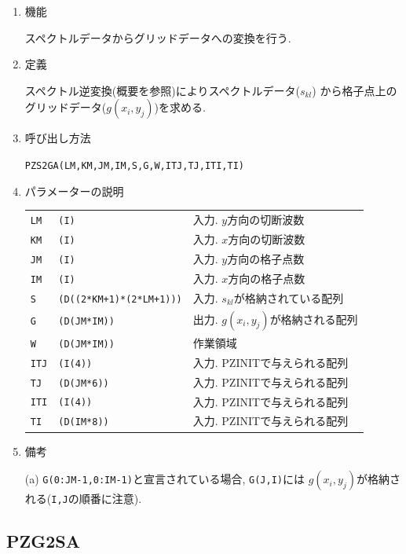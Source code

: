 \documentclass[a4j,fleqn]{jarticle}
\begin{document}
\begin{enumerate}

\item 機能 

スペクトルデータからグリッドデータへの変換を行う.

\item 定義

スペクトル逆変換(概要を参照)によりスペクトルデータ($s_{kl}$)
から格子点上のグリッドデータ($g(x_i,y_j)$)を求める.

\item 呼び出し方法 

{\tt PZS2GA(LM,KM,JM,IM,S,G,W,ITJ,TJ,ITI,TI)}
  
\item パラメーターの説明

\begin{tabular}{lll}
{\tt LM} & {\tt (I)} & 入力. $y$方向の切断波数\\
{\tt KM} & {\tt (I)} & 入力. $x$方向の切断波数\\
{\tt JM} & {\tt (I)} & 入力. $y$方向の格子点数\\
{\tt IM} & {\tt (I)} & 入力. $x$方向の格子点数\\
{\tt S} & {\tt (D((2*KM+1)*(2*LM+1)))} & 入力. $s_{kl}$が格納されている配列\\
{\tt G} & {\tt (D(JM*IM))} & 出力. $g(x_i,y_j)$が格納される配列\\
{\tt W} & {\tt (D(JM*IM))} & 作業領域\\
{\tt ITJ} & {\tt (I(4))} & 入力. PZINITで与えられる配列\\
{\tt TJ} & {\tt (D(JM*6))} & 入力. PZINITで与えられる配列\\
{\tt ITI} & {\tt (I(4))} & 入力. PZINITで与えられる配列\\
{\tt TI} & {\tt (D(IM*8))} & 入力. PZINITで与えられる配列
\end{tabular}

\item 備考

(a) {\tt G(0:JM-1,0:IM-1)}と宣言されている場合, {\tt G(J,I)}には
    $g(x_i,y_j)$が格納される({\tt I,J}の順番に注意).

\end{enumerate}


\subsection{PZG2SA}
\end{document}
